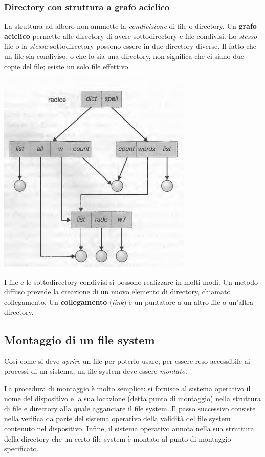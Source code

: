 \documentclass[11pt,a4paper]{article}
\begin{document}
{\subsubsection{Directory con struttura a grafo aciclico}
La struttura ad albero non ammette la \emph{condivisione} di file o directory. Un \textbf{grafo acicli­co}  permette alle directory di avere sottodirectory e file condivisi. Lo \emph{stesso} fi­le o la \emph{stessa} sottodirectory possono essere in due directory diverse. Il fatto che un file sia condiviso, o che lo sia una directory, non significa che ci siano due copie del file; esiste un solo file effettivo.
\begin{center}
  \includegraphics[scale=0.6]{img/0063.png}
\end{center}
I file e le sottodirectory condivisi si possono realizzare in molti modi. Un metodo diffu­so prevede la creazione di un nuovo elemento di directory, chiamato collegamento. Un \textbf{collegamento} (\emph{link}) è un puntatore a un altro file o un'altra directory.

\subsection{Montaggio di un file system}
Così come si deve \emph{aprire} un file per poterlo usare, per essere reso accessibile ai processi di un
sistema, un file system deve essere \emph{montato}.

La procedura di montaggio è molto semplice: si fornisce al sistema operativo il nome
del dispositivo e la sua locazione (detta punto di montaggio) nella struttura di file e direc­tory alla quale agganciare il file system. Il passo successivo consiste nella verifica da parte del sistema operativo della validità del file system contenuto nel dispositivo. Infine, il sistema operativo annota nella sua struttura della directory che un certo file system è montato al punto di montaggio specificato.

}
\end{document}
